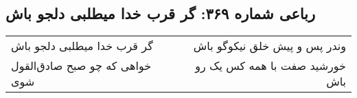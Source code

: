 \begin{center}
\section*{رباعی شماره ۳۶۹: گر قرب خدا میطلبی دلجو باش}
\label{sec:sh369}
\begin{longtable}{l p{0.5cm} r}
گر قرب خدا میطلبی دلجو باش
&&
وندر پس و پیش خلق نیکوگو باش
\\
خواهی که چو صبح صادق‌القول شوی
&&
خورشید صفت با همه کس یک رو باش
\\
\end{longtable}
\end{center}
